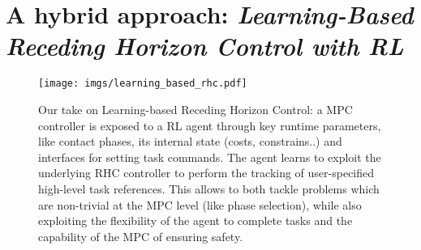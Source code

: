 \section{A hybrid approach: \textnormal{\textit{Learning-Based Receding Horizon Control with RL}}}
\cite{rl:tsounis2020deepgait}
\cite{rl:gangapurwala2021real}
\begin{figure*}[t]
	\centering
	\vspace{0.1cm}
	\texttt{[image: imgs/learning\_based\_rhc.pdf]}
	\caption{Our take on Learning-based Receding Horizon Control: a MPC controller is exposed to a RL agent through key runtime parameters, like contact phases, its internal state (costs, constrains..) and interfaces for setting task commands. The agent learns to exploit the underlying RHC controller to perform the tracking of user-specified high-level task references. This allows to both tackle problems which are non-trivial at the MPC level (like phase selection), while also exploiting the flexibility of the agent to complete tasks and the capability of the MPC of ensuring safety.}
	\label{fig:lrhc_arch}
\end{figure*}
